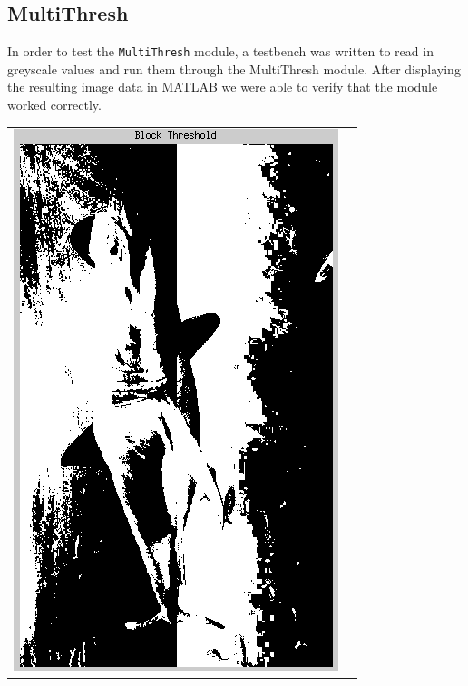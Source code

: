 \documentclass[12pt]{article}
\begin{document}
  \subsection{MultiThresh}
  In order to test the \texttt{MultiThresh} module, a testbench was written to read in greyscale values and run them through the MultiThresh module. After displaying the resulting image data in MATLAB we were able to verify that the module worked correctly.
  \begin{table}[h!]
\begin{center}
\begin{tabular} {c c}
  \includegraphics[scale=.6]{Images/TotalModule/BlockThresholded.png}
&

\end{tabular}
\end{center}
\end{table}
\end{document}
